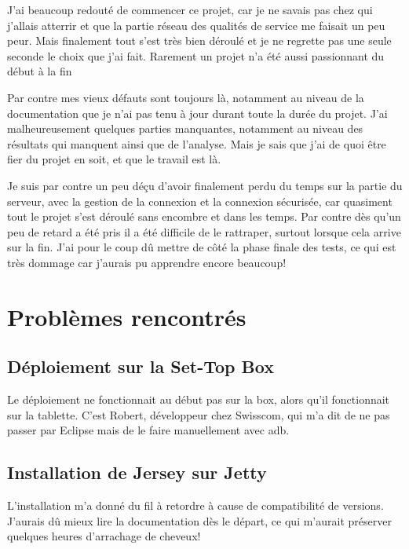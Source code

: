 \medskip

J'ai beaucoup redouté de commencer ce projet, car je ne savais pas chez qui j'allais atterrir et que la partie réseau des qualités de service me faisait un peu peur. Mais finalement tout s'est très bien déroulé et je ne regrette pas une seule seconde le choix que j'ai fait. Rarement un projet n'a été aussi passionnant du début à la fin

\medskip

Par contre mes vieux défauts sont toujours là, notamment au niveau de la documentation que je n'ai pas tenu à jour durant toute la durée du projet. J'ai malheureusement quelques parties manquantes, notamment au niveau des résultats qui manquent ainsi que de l'analyse. Mais je sais que j'ai de quoi être fier du projet en soit, et que le travail est là.

\medskip

Je suis par contre un peu déçu d'avoir finalement perdu du temps sur la partie du serveur, avec la gestion de la connexion et la connexion sécurisée, car quasiment tout le projet s'est déroulé sans encombre et dans les temps. Par contre dès qu'un peu de retard a été pris il a été difficile de le rattraper, surtout lorsque cela arrive sur la fin. J'ai pour le coup dû mettre de côté la phase finale des tests, ce qui est très dommage car j'aurais pu apprendre encore beaucoup!
\section{Problèmes rencontrés} %
\label{sec:probl_mes_rencontr_s}

\subsection{Déploiement sur la Set-Top Box} %
Le déploiement ne fonctionnait au début pas sur la box, alors qu'il fonctionnait sur la tablette. C'est Robert, développeur chez Swisscom, qui m'a dit de ne pas passer par Eclipse mais de le faire manuellement avec adb.

\subsection{Installation de Jersey sur Jetty} %
L'installation m'a donné du fil à retordre à cause de compatibilité de versions. J'aurais dû mieux lire la documentation dès le départ, ce qui m'aurait préserver quelques heures d'arrachage de cheveux!

